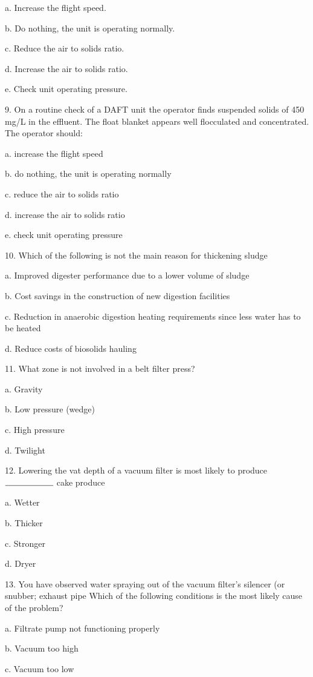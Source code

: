 \documentclass{article}
\begin{document}
a. Increase the flight speed. 

b. Do nothing, the unit is operating normally. 

c. Reduce the air to solids ratio. 

d. Increase the air to solids ratio. 

e. Check unit operating pressure. 


9. On a routine check of a DAFT unit the operator finds suspended solids of 450 mg/L in the effluent. The float blanket appears well flocculated and concentrated. The operator should: 

a. increase the flight speed 

b. do nothing, the unit is operating normally 

c. reduce the air to solids ratio 

d. increase the air to solids ratio 

e. check unit operating pressure 


10. Which of the following is not the main reason for thickening sludge 

a. Improved digester performance due to a lower volume of sludge 

b. Cost savings in the construction of new digestion facilities 

c. Reduction in anaerobic digestion heating requirements since less water has to be heated 

d. Reduce costs of biosolids hauling 


11. What zone is not involved in a belt filter press? 

a. Gravity 

b. Low pressure (wedge) 

c. High pressure 

d. Twilight 


12. Lowering the vat depth of a vacuum filter is most likely to produce $\rule{2cm}{0.15mm}$ cake produce 

a. Wetter 

b. Thicker 

c. Stronger 

d. Dryer 


13. You have observed water spraying out of the vacuum filter's silencer (or snubber; exhaust pipe Which of the following conditions is the most likely cause of the problem? 

a. Filtrate pump not functioning properly 

b. Vacuum too high 

c. Vacuum too low 
\end{document}
